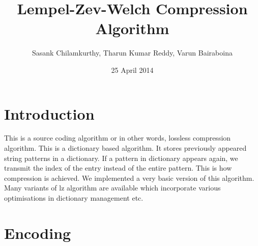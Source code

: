 \documentclass[a4paper]{article}
\title{Lempel-Zev-Welch Compression Algorithm}
\author{Sasank Chilamkurthy, Tharun Kumar Reddy, Varun Bairaboina}
\date{25 April 2014}
\begin{document}
\maketitle



%





\section{Introduction}
This is a source coding algorithm or in other words, lossless compression algorithm. This is a dictionary based algorithm. It stores previously appeared string patterns in a dictionary. If a pattern in dictionary appears again, we transmit the index of the entry instead of the entire pattern. This is how compression is achieved. We implemented a very basic version of this algorithm. Many variants of lz algorithm are available which incorporate various optimisations in dictionary management etc.

\section{Encoding}
\end{document}
